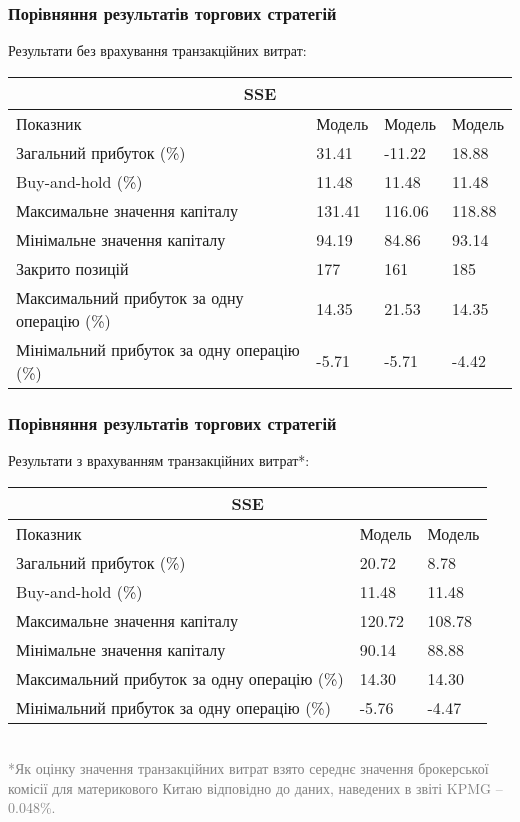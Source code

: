 \documentclass[aspectratio=169]{beamer}
\begin{document}
\begin{frame}
\frametitle{Порівняння результатів торгових стратегій}
Результати без врахування транзакційних витрат:\\
\bigskip
\begin{tabular}{ |p{7.8cm}||p{1.6cm}|p{1.6cm}|p{1.6cm}|  }
 \hline
 \multicolumn{4}{|c|}{SSE} \\
 \hline
 Показник& Модель #1 &Модель #2&Модель #3\\
 \hline
 Загальний прибуток (\%)&\cellcolor{green!25}31.41&	\cellcolor{pink!25}-11.22&	\cellcolor{green!25}18.88\\
 Buy-and-hold (\%) & \cellcolor{blue!8}11.48 &\cellcolor{blue!8}11.48 &\cellcolor{blue!8}11.48\\
 Максимальне значення капіталу &	131.41&	116.06&	118.88\\
Мінімальне значення капіталу&	94.19&	84.86&	93.14\\
Закрито позицій&177&	161	&185	\\
Максимальний прибуток за одну операцію (\%)&	14.35&	21.53&	14.35\\
Мінімальний прибуток за одну операцію (\%)& -5.71&	-5.71&	-4.42	\\
 \hline
\end{tabular}
\end{frame}

\begin{frame}
\frametitle{Порівняння результатів торгових стратегій}
Результати з врахуванням транзакційних витрат*:\\
\bigskip
\begin{tabular}{ |p{8cm}||p{2.3cm}|p{2.3cm}| }
 \hline
 \multicolumn{3}{|c|}{SSE} \\
 \hline
 Показник& Модель #1 &Модель #3\\
 \hline
 Загальний прибуток (\%)&\cellcolor{green!25}20.72&	\cellcolor{pink!25}8.78\\
 Buy-and-hold (\%) & \cellcolor{blue!8}11.48 &\cellcolor{blue!8}11.48\\
 Максимальне значення капіталу &120.72	&108.78	\\
Мінімальне значення капіталу&90.14	&88.88	\\
Максимальний прибуток за одну операцію (\%)&	14.30	&14.30\\
Мінімальний прибуток за одну операцію (\%)&	-5.76	&-4.47\\
 \hline
\end{tabular}
\bigskip
\\
\textcolor{gray}{*Як оцінку значення транзакційних витрат взято середнє значення брокерської комісії для материкового Китаю відповідно до даних, наведених в звіті KPMG – 0.048\%.}
\end{frame}
\end{document}
